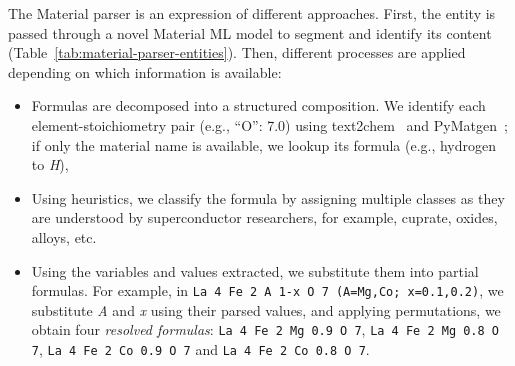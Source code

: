 The Material parser is an expression of different approaches. 
First, the entity is passed through a novel Material ML model to segment and identify its content (Table~\ref{tab:material-parser-entities}).
Then, different processes are applied depending on which information is available: 
\begin{itemize}
    \item Formulas are decomposed into a structured composition. We identify each element-stoichiometry pair (e.g., ``O'': 7.0) using text2chem~\cite{kononova2019text} and PyMatgen~\cite{Ong2013}; if only the material name is available, we lookup its formula (e.g., hydrogen to \textit{H}),
    \item Using heuristics, we classify the formula by assigning multiple classes as they are understood by superconductor researchers, for example, cuprate, oxides, alloys, etc.
    \item Using the variables and values extracted, we substitute them into partial formulas. For example, in \texttt{La 4 Fe 2 A 1-x O 7 (A=Mg,Co; x=0.1,0.2)}, we substitute \textit{A} and \textit{x} using their parsed values, and applying permutations, we obtain four \textit{resolved formulas}: \texttt{La 4 Fe 2 Mg 0.9 O 7}, \texttt{La 4 Fe 2 Mg 0.8 O 7}, \texttt{La 4 Fe 2 Co 0.9 O 7} and \texttt{La 4 Fe 2 Co 0.8 O 7}.
\end{itemize}

